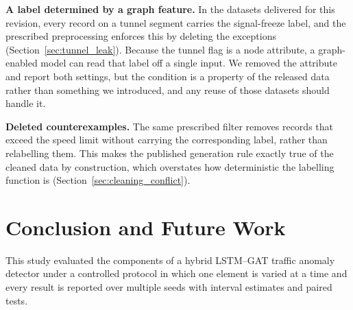 \documentclass[journal]{IEEEtran}
\begin{document}
\textbf{A label determined by a graph feature.} In the datasets delivered for this revision, every record on a tunnel segment carries the signal-freeze label, and the prescribed preprocessing enforces this by deleting the exceptions (Section~\ref{sec:tunnel_leak}). Because the tunnel flag is a node attribute, a graph-enabled model can read that label off a single input. We removed the attribute and report both settings, but the condition is a property of the released data rather than something we introduced, and any reuse of those datasets should handle it.

\textbf{Deleted counterexamples.} The same prescribed filter removes records that exceed the speed limit without carrying the corresponding label, rather than relabelling them. This makes the published generation rule exactly true of the cleaned data by construction, which overstates how deterministic the labelling function is (Section~\ref{sec:cleaning_conflict}).

\section{Conclusion and Future Work}

This study evaluated the components of a hybrid LSTM--GAT traffic anomaly detector under a controlled protocol in which one element is varied at a time and every result is reported over multiple seeds with interval estimates and paired tests.
\end{document}
